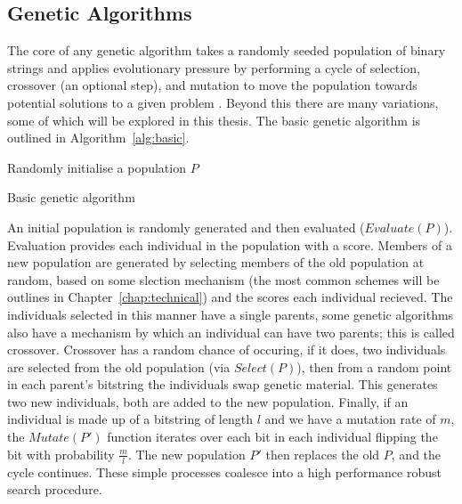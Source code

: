 \subsection{Genetic Algorithms}
The core of any genetic algorithm takes a randomly seeded population of binary strings
and applies
evolutionary pressure by performing a cycle of selection, crossover (an optional
step), and mutation
to move the population towards potential solutions to a given problem \cite{Goldberg:1989:GAS:534133}.
Beyond this there are many
variations, some of which will be explored in this thesis. The basic genetic algorithm is
outlined in Algorithm~\ref{alg:basic}.

\begin{algorithm}
	Randomly initialise a population $P$\\
	\caption{Basic genetic algorithm}
	\label{alg:basic}
\end{algorithm}

An initial population is randomly generated and then
evaluated ($Evaluate(P)$). Evaluation provides each individual in the population with a score.
Members of a new population are generated by selecting members of the old population
at random, based on some slection mechanism (the most common schemes will be outlines
in Chapter~\ref{chap:technical}) and the scores each individual recieved. The individuals
selected in this manner have a single parents, some genetic algorithms also have a mechanism
by which an individual can have two parents; this is called crossover. Crossover has a
random chance of occuring, if it does, two individuals are selected from the old
population (via $Select(P)$), then from a random point in each parent's bitstring the
individuals swap
genetic material. This generates two new individuals, both are added to the
new population.
Finally, if an individual is made up of a bitstring of length $l$ and we have a mutation rate
of $m$, the $Mutate(P')$ function iterates over each bit in each individual flipping the bit with
probability $\frac{m}{l}$. The new population $P'$ then replaces the old $P$, and the cycle continues.
These simple processes coalesce into a high performance robust search
procedure.

